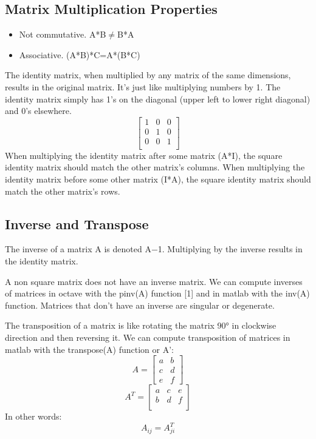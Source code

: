 \documentclass{article}
\begin{document}
\subsection{Matrix Multiplication Properties}
\begin{itemize}
\item Not commutative. A*B$\neq$B*A
\item Associative. (A*B)*C=A*(B*C)
\end{itemize}
The identity matrix, when multiplied by any matrix of the same dimensions, results in the original matrix. It's just like multiplying numbers by 1. The identity matrix simply has 1's on the diagonal (upper left to lower right diagonal) and 0's elsewhere.
$$\begin{bmatrix}  1 & 0 & 0 \\   0 & 1 & 0 \\   0 & 0 & 1 \\ \end{bmatrix}$$
When multiplying the identity matrix after some matrix (A*I), the square identity matrix should match the other matrix's columns. When multiplying the identity matrix before some other matrix (I*A), the square identity matrix should match the other matrix's rows.
\subsection{Inverse and Transpose}
The inverse of a matrix A is denoted A−1. Multiplying by the inverse results in the identity matrix.

A non square matrix does not have an inverse matrix. We can compute inverses of matrices in octave with the pinv(A) function [1] and in matlab with the inv(A) function. Matrices that don't have an inverse are singular or degenerate.

The transposition of a matrix is like rotating the matrix 90° in clockwise direction and then reversing it. We can compute transposition of matrices in matlab with the transpose(A) function or A':
$$A =  \begin{bmatrix}  a & b \\   c & d \\   e & f \end{bmatrix}$$
$$A^T = \begin{bmatrix} a & c & e \\ b & d & f \\ \end{bmatrix}$$
In other words:
$$A_{ij} = A^T_{ji}$$
\end{document}
